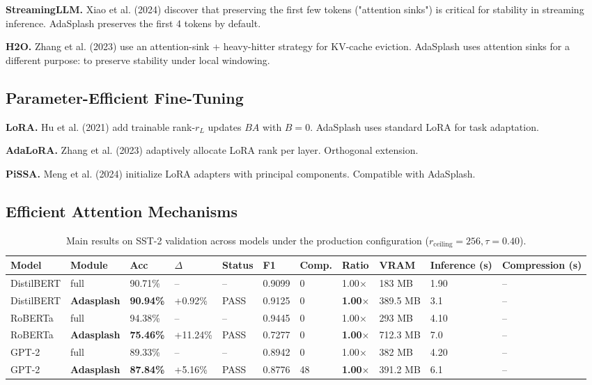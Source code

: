 \textbf{StreamingLLM.} Xiao et al. (2024) discover that preserving the first 
few tokens ("attention sinks") is critical for stability in streaming 
inference. AdaSplash preserves the first 4 tokens by default.

\textbf{H2O.} Zhang et al. (2023) use an attention-sink + heavy-hitter strategy 
for KV-cache eviction. AdaSplash uses attention sinks for a different purpose: 
to preserve stability under local windowing.

\subsection{Parameter-Efficient Fine-Tuning}

\textbf{LoRA.} Hu et al. (2021) add trainable rank-$r_L$ updates $B A$ with 
$B = 0$. AdaSplash uses standard LoRA for task adaptation.

\textbf{AdaLoRA.} Zhang et al. (2023) adaptively allocate LoRA rank per layer. 
Orthogonal extension.

\textbf{PiSSA.} Meng et al. (2024) initialize LoRA adapters with principal 
components. Compatible with AdaSplash.

\subsection{Efficient Attention Mechanisms}

\begin{table}[t]
\centering
\small
\begin{tabular}{lllllllllll}
\toprule
\textbf{Model} & \textbf{Module} & \textbf{Acc} & \textbf{$\Delta$} & \textbf{Status} & \textbf{F1} & \textbf{Comp.} & \textbf{Ratio} & \textbf{VRAM} & \textbf{Inference (s)} & \textbf{Compression (s)} \\
\midrule
DistilBERT & full & 90.71\% & -- & -- & 0.9099 & 0 & 1.00$\times$ & 183 MB & 1.90 & -- \\
DistilBERT & \textbf{Adasplash} & \textbf{90.94\%} & +0.92\% & PASS & 0.9125 & 0 & \textbf{1.00$\times$} & 389.5 MB & 3.1 & -- \\
RoBERTa & full & 94.38\% & -- & -- & 0.9445 & 0 & 1.00$\times$ & 293 MB & 4.10 & -- \\
RoBERTa & \textbf{Adasplash} & \textbf{75.46\%} & +11.24\% & PASS & 0.7277 & 0 & \textbf{1.00$\times$} & 712.3 MB & 7.0 & -- \\
GPT-2 & full & 89.33\% & -- & -- & 0.8942 & 0 & 1.00$\times$ & 382 MB & 4.20 & -- \\
GPT-2 & \textbf{Adasplash} & \textbf{87.84\%} & +5.16\% & PASS & 0.8776 & 48 & \textbf{1.00$\times$} & 391.2 MB & 6.1 & -- \\
\bottomrule
\end{tabular}
\caption{Main results on SST-2 validation across models under the production configuration ($r_{\mathrm{ceiling}}=256, \tau=0.40$).}
\label{tab:main_sst2}
\end{table}


